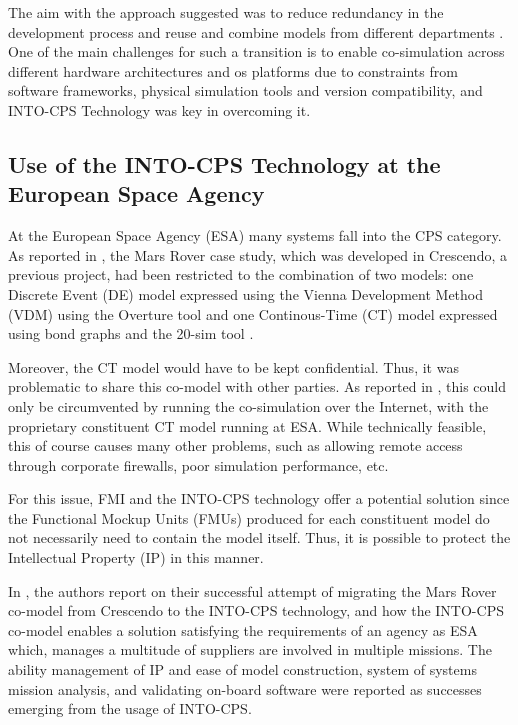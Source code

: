 The aim with the approach suggested was to reduce redundancy in the
development process and reuse and combine models from different
departments \cite{Pedersen&17}. One of the main challenges for such a transition
is to enable co-simulation across different hardware architectures and \ac{os}
platforms due to constraints from software frameworks, physical simulation
tools and version compatibility, and INTO-CPS Technology was key in overcoming
it.

\subsection{Use of the INTO-CPS Technology at the European Space Agency}


At the European Space Agency (ESA) many systems fall into the CPS category.  As
reported in \cite{Feo-Arenis&17}, the Mars Rover case study, which was
developed in Crescendo, a previous project, had been restricted to the
combination of two models:  one Discrete Event (DE) model expressed using the
Vienna Development Method (VDM) \cite{Fitzgerald&08c} using the Overture tool
\cite{Larsen&10a} and one Continous-Time (CT) model expressed using bond graphs
\cite{Karnopp&68} and the 20-sim tool \cite{Kleijn06}. 

Moreover, the CT model would have to be kept confidential.  Thus, it was
problematic to share this co-model with other parties.  As reported in
\cite{Feo-Arenis&17}, this could only be circumvented by running the
co-simulation over the Internet, with the proprietary constituent CT model
running at ESA. While technically feasible, this of course causes many other
problems, such as allowing remote access through corporate firewalls, poor
simulation performance, etc.

For this issue, FMI and the INTO-CPS technology offer a potential solution since
the Functional Mockup Units (FMUs) produced for each constituent model do not
necessarily need to contain the model itself. Thus, it is possible to protect
the Intellectual Property (IP) in this manner. 

In \cite{Feo-Arenis&17}, the authors report on their successful attempt of
migrating the Mars Rover co-model from Crescendo to the INTO-CPS technology,
and how the INTO-CPS co-model enables a solution satisfying the requirements of
an agency as ESA which, manages a multitude of suppliers are involved in
multiple  missions. The ability management of IP and ease of model
construction, system of systems mission analysis, and validating on-board
software were reported as successes emerging from the usage of INTO-CPS.


